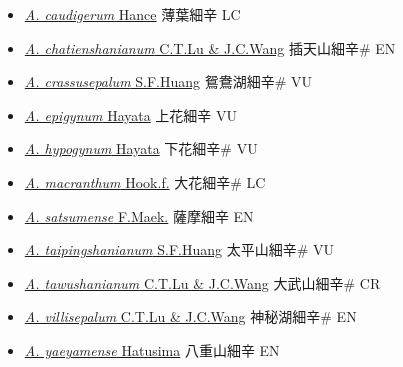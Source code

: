 \begin{itemize}
  \begin{itemize}
        \item[] \href{http://www.theplantlist.org/tpl1.1/search?q=Asarum+caudigerum}{\textit{A. caudigerum} Hance}   薄葉細辛 LC
        \item[] \href{http://www.theplantlist.org/tpl1.1/search?q=Asarum+chatienshanianum}{\textit{A. chatienshanianum} C.T.Lu \& J.C.Wang}   插天山細辛\# EN
        \item[] \href{http://www.theplantlist.org/tpl1.1/search?q=Asarum+crassusepalum}{\textit{A. crassusepalum} S.F.Huang}   鴛鴦湖細辛\# VU
        \item[] \href{http://www.theplantlist.org/tpl1.1/search?q=Asarum+epigynum}{\textit{A. epigynum} Hayata}   上花細辛 VU
        \item[] \href{http://www.theplantlist.org/tpl1.1/search?q=Asarum+hypogynum}{\textit{A. hypogynum} Hayata}   下花細辛\# VU
        \item[] \href{http://www.theplantlist.org/tpl1.1/search?q=Asarum+macranthum}{\textit{A. macranthum} Hook.f.}   大花細辛\# LC
        \item[] \href{http://www.theplantlist.org/tpl1.1/search?q=Asarum+satsumense}{\textit{A. satsumense} F.Maek.}   薩摩細辛 EN
        \item[] \href{http://www.theplantlist.org/tpl1.1/search?q=Asarum+taipingshanianum}{\textit{A. taipingshanianum} S.F.Huang}   太平山細辛\# VU
        \item[] \href{http://www.theplantlist.org/tpl1.1/search?q=Asarum+tawushanianum}{\textit{A. tawushanianum} C.T.Lu \& J.C.Wang}   大武山細辛\# CR
        \item[] \href{http://www.theplantlist.org/tpl1.1/search?q=Asarum+villisepalum}{\textit{A. villisepalum} C.T.Lu \& J.C.Wang}   神秘湖細辛\# EN
        \item[] \href{http://www.theplantlist.org/tpl1.1/search?q=Asarum+yaeyamense}{\textit{A. yaeyamense} Hatusima}   八重山細辛 EN
  \end{itemize}
  \end{itemize}
